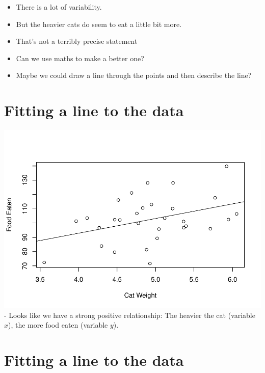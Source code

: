 \documentclass[]{article}
\providecommand{\tightlist}{%
  \setlength{\itemsep}{0pt}\setlength{\parskip}{0pt}}
\begin{document}
\begin{itemize}
\tightlist
\item
  There is a lot of variability.
\item
  But the heavier cats do seem to eat a little bit more.
\item
  That's not a terribly precise statement
\item
  Can we use maths to make a better one?
\item
  Maybe we could draw a line through the points and then describe the
  line?
\end{itemize}

\section{Fitting a line to the data}\label{fitting-a-line-to-the-data}

\includegraphics{Basics_of_Regression_files/figure-latex/unnamed-chunk-4-1.pdf}
- Looks like we have a strong positive relationship: The heavier the cat
(variable \(x\)), the more food eaten (variable \(y\)).

\section{Fitting a line to the data}\label{fitting-a-line-to-the-data-1}
\end{document}
